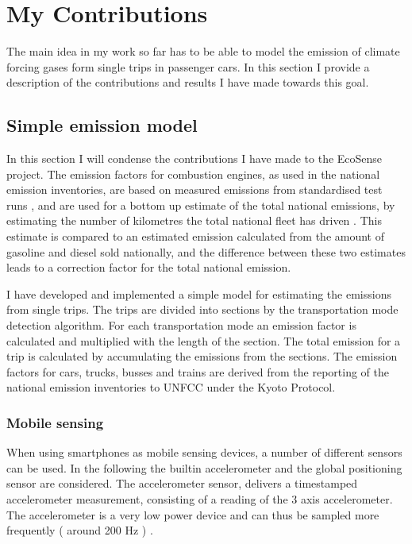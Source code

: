 \section {My Contributions}\label{contributions}
The main idea in my work so far has to be able to model the emission of climate forcing gases form single trips in passenger cars. In this section I provide a description of the contributions and results I have made towards this goal.

\subsection{Simple emission model}
In this section I will condense the contributions I have made to the EcoSense project. The emission factors for combustion engines, as used in the national emission inventories, are based on measured emissions from standardised test runs \cite{Andre2004}, and are used for a bottom up estimate of the total national emissions, by estimating the number of kilometres the total national fleet has driven \cite{nielsen2014}. This estimate is compared to an estimated emission calculated from the amount of gasoline and diesel sold nationally, and the difference between these two estimates leads to a correction factor for the total national emission.

I have developed and implemented a simple model for estimating the emissions from single trips. The trips are divided into sections by the transportation mode detection algorithm. For each transportation mode an emission factor is calculated and multiplied with the length of the section. The total emission for a trip is calculated by accumulating the emissions from the sections. The emission factors for cars, trucks, busses and trains are derived from the reporting of the national emission inventories to UNFCC under the Kyoto Protocol. 

\subsubsection{Mobile sensing}
When using smartphones as mobile sensing devices, a number of different sensors can be used. In the following the builtin accelerometer and the global positioning sensor are considered. The accelerometer sensor, delivers a timestamped accelerometer measurement, consisting of a reading of the 3 axis accelerometer. The accelerometer is a very low power device and can thus be sampled more frequently ( around 200 Hz ) \cite{Kjaergaard2009}.

